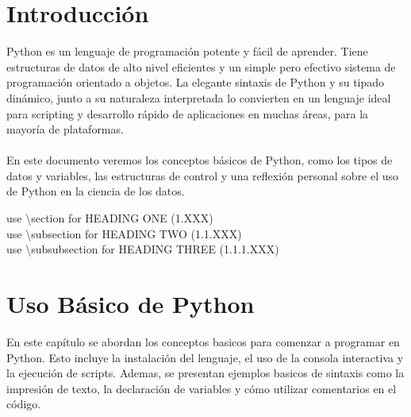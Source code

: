 \documentclass[a4paper, 12pt]{article}
\begin{document}

\clearpage
\tableofcontents
\listoffigures
\listoftables
\clearpage

\pagestyle{fancy}

\section{Introducción}
Python es un lenguaje de programación potente y fácil de aprender. Tiene estructuras de datos de alto nivel eficientes y un simple pero efectivo sistema de programación orientado a objetos. La elegante sintaxis de Python y su tipado dinámico, junto a su naturaleza interpretada lo convierten en un lenguaje ideal para scripting y desarrollo rápido de aplicaciones en muchas áreas, para la mayoría de plataformas.\cite{DocumentationPython}
\\
\\
En este documento veremos los conceptos básicos de Python, como los tipos de datos y variables, las estructuras de control y una reflexión personal sobre el uso de Python en la ciencia de los datos.

use \textbackslash section for HEADING ONE (1.XXX)\\
use \textbackslash subsection for HEADING TWO (1.1.XXX)\\
use \textbackslash subsubsection for HEADING THREE (1.1.1.XXX)

\clearpage
\section{Uso Básico de Python}
En este capítulo se abordan los conceptos basicos para comenzar a programar en Python. Esto incluye la instalación del lenguaje, el uso de la consola interactiva y la ejecución de scripts. Ademas, se presentan ejemplos basicos de sintaxis como la impresión de texto, la declaración de variables y cómo utilizar comentarios en el código.
\end{document}
